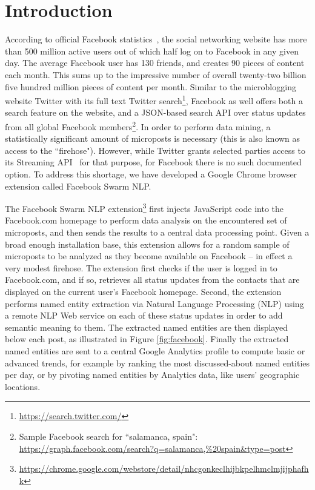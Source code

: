 \documentclass[conference]{IEEEtran}
\begin{document}
\section{Introduction}                                                      \label{sec:introduction}
According to official Facebook statistics~\cite{Facebook}, the social networking website has more than 500 million active users out of which half log on to Facebook in any given day. The average Facebook user has 130 friends, and creates 90 pieces of content each month. This sums up to the impressive number of overall twenty-two billion five hundred million pieces of content per month. Similar to the microblogging website Twitter with its full text Twitter search\footnote{\url{https://search.twitter.com/}}, Facebook as well offers both a search feature on the website, and a JSON-based search API over status updates from all global Facebook members\footnote{Sample Facebook search for ``salamanca, spain": \url{https://graph.facebook.com/search?q=salamanca,\%20spain&type=post}}. In order to perform data mining, a statistically significant amount of microposts is necessary (this is also known as access to the ``firehose"). However, while Twitter grants selected parties access to its Streaming API~\cite{Twitter} for that purpose, for Facebook there is no such documented option. To address this shortage, we have developed a Google Chrome browser extension called Facebook Swarm NLP.

The Facebook Swarm NLP extension\footnote{\url{https://chrome.google.com/webstore/detail/nhcgonkeclhijbkpelhmclmjijphafhk}} first injects JavaScript code into the Facebook.com homepage to perform data analysis on the encountered set of microposts, and then sends the results to a central data processing point. Given a broad enough installation base, this extension allows for a random sample of microposts to be analyzed as they become available on Facebook -- in effect a very modest firehose. The extension first checks if the user is logged in to Facebook.com, and if so, retrieves all status updates from the contacts that are displayed on the current user's Facebook homepage. Second, the extension performs named entity extraction via Natural Language Processing (NLP) using a remote NLP Web service on each of these status updates in order to add semantic meaning to them. The extracted named entities are then displayed below each post, as illustrated in Figure \ref{fig:facebook}. Finally the extracted named entities are sent to a central Google Analytics\cite{Kaushik} profile to compute basic or advanced trends, for example by ranking the most discussed-about named entities per day, or by pivoting named entities by Analytics data, like users' geographic locations.
\end{document}
